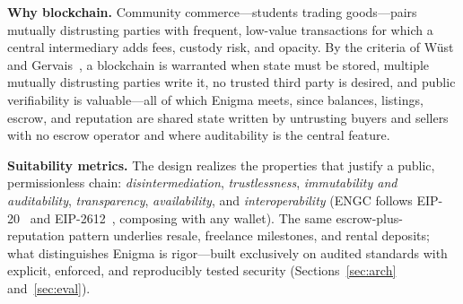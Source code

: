 \textbf{Why blockchain.} Community commerce---students trading goods---pairs mutually distrusting parties with frequent, low-value transactions for which a central intermediary adds fees, custody risk, and opacity. By the criteria of W\"ust and Gervais~\cite{wust2018blockchain}, a blockchain is warranted when state must be stored, multiple mutually distrusting parties write it, no trusted third party is desired, and public verifiability is valuable---all of which Enigma meets, since balances, listings, escrow, and reputation are shared state written by untrusting buyers and sellers with no escrow operator and where auditability is the central feature.

\textbf{Suitability metrics.} The design realizes the properties that justify a public, permissionless chain: \emph{disintermediation}, \emph{trustlessness}, \emph{immutability and auditability}, \emph{transparency}, \emph{availability}, and \emph{interoperability} (ENGC follows EIP-20~\cite{eip20} and EIP-2612~\cite{eip2612}, composing with any wallet). The same escrow-plus-reputation pattern underlies resale, freelance milestones, and rental deposits; what distinguishes Enigma is rigor---built exclusively on audited standards with explicit, enforced, and reproducibly tested security (Sections~\ref{sec:arch} and~\ref{sec:eval}).
